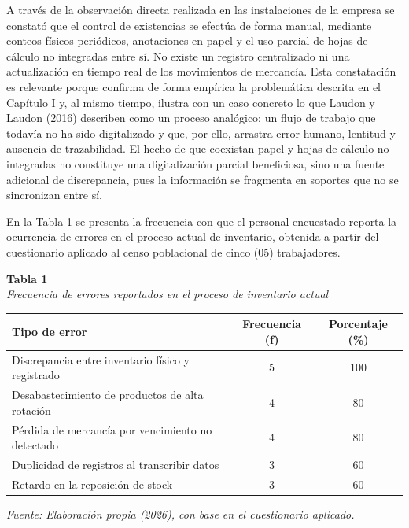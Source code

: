 \documentclass[12pt, letterpaper]{report}
\begin{document}
A través de la observación directa realizada en las instalaciones de
la empresa se constató que el control de existencias se efectúa de
forma manual, mediante conteos físicos periódicos, anotaciones en
papel y el uso parcial de hojas de cálculo no integradas entre sí. No
existe un registro centralizado ni una actualización en tiempo real de
los movimientos de mercancía. Esta constatación es relevante porque
confirma de forma empírica la problemática descrita en el Capítulo I y,
al mismo tiempo, ilustra con un caso concreto lo que Laudon y Laudon
(2016) describen como un proceso analógico: un flujo de trabajo que
todavía no ha sido digitalizado y que, por ello, arrastra error humano,
lentitud y ausencia de trazabilidad. El hecho de que coexistan papel y
hojas de cálculo no integradas no constituye una digitalización
parcial beneficiosa, sino una fuente adicional de discrepancia, pues la
información se fragmenta en soportes que no se sincronizan entre sí.

En la Tabla 1 se presenta la frecuencia con que el personal encuestado
reporta la ocurrencia de errores en el proceso actual de inventario,
obtenida a partir del cuestionario aplicado al censo poblacional de
cinco (05) trabajadores.

\vspace{6pt}
%
\noindent\textbf{Tabla 1}\\
\textit{Frecuencia de errores reportados en el proceso de inventario
actual}
\vspace{4pt}

\begin{center}
\begin{tabular}{|>{\raggedright\arraybackslash}p{6.0cm}|c|c|}
\hline
\textbf{Tipo de error} & \textbf{Frecuencia (f)} &
\textbf{Porcentaje (\%)} \\
\hline
Discrepancia entre inventario físico y registrado & 5 & 100 \\
\hline
Desabastecimiento de productos de alta rotación & 4 & 80 \\
\hline
Pérdida de mercancía por vencimiento no detectado & 4 & 80 \\
\hline
Duplicidad de registros al transcribir datos & 3 & 60 \\
\hline
Retardo en la reposición de stock & 3 & 60 \\
\hline
\end{tabular}
\end{center}
\vspace{2pt}
\noindent\small\textit{Fuente: Elaboración propia (2026), con base en
el cuestionario aplicado.}\normalsize
{}
\end{document}
